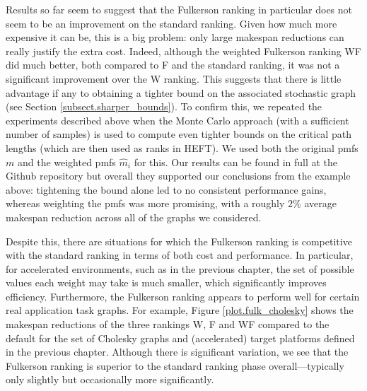 \documentclass[12pt]{article}
\begin{document}
Results so far seem to suggest that the Fulkerson ranking in particular does not seem to be an improvement on the standard ranking. Given how much more expensive it can be, this is a big problem: only large makespan reductions can really justify the extra cost. Indeed, although the weighted Fulkerson ranking WF did much better, both compared to F and the standard ranking, it was not a significant improvement over the W ranking. This suggests that there is little advantage if any to obtaining a tighter bound on the associated stochastic graph (see Section \ref{subsect.sharper_bounds}). To confirm this, we repeated the experiments described above when the Monte Carlo approach (with a sufficient number of samples) is used to compute even tighter bounds on the critical path lengths (which are then used as ranks in HEFT). We used both the original pmfs $m$ and the weighted pmfs $\hat{m}_i$ for this. Our results can be found in full at the Github repository but overall they supported our conclusions from the example above: tightening the bound alone led to no consistent performance gains, whereas weighting the pmfs was more promising, with a roughly $2\%$ average makespan reduction across all of the graphs we considered.       

Despite this, there are situations for which the Fulkerson ranking is competitive with the standard ranking in terms of both cost and performance. In particular, for accelerated environments, such as in the previous chapter, the set of possible values each weight may take is much smaller, which significantly improves efficiency. Furthermore, the Fulkerson ranking appears to perform well for certain real application task graphs. For example, Figure \ref{plot.fulk_cholesky} shows the makespan reductions of the three rankings W, F and WF compared to the default for the set of Cholesky graphs and (accelerated) target platforms defined in the previous chapter. Although there is significant variation, we see that the Fulkerson ranking is superior to the standard ranking phase overall---typically only slightly but occasionally more significantly.   
\end{document}
